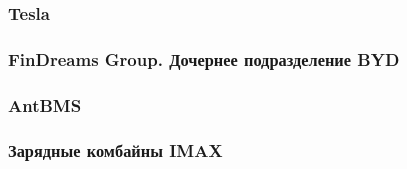 \subsubsection{Tesla}


\subsubsection{FinDreams Group. Дочернее подразделение BYD}


\subsubsection{AntBMS}


\subsubsection{Зарядные комбайны IMAX}

